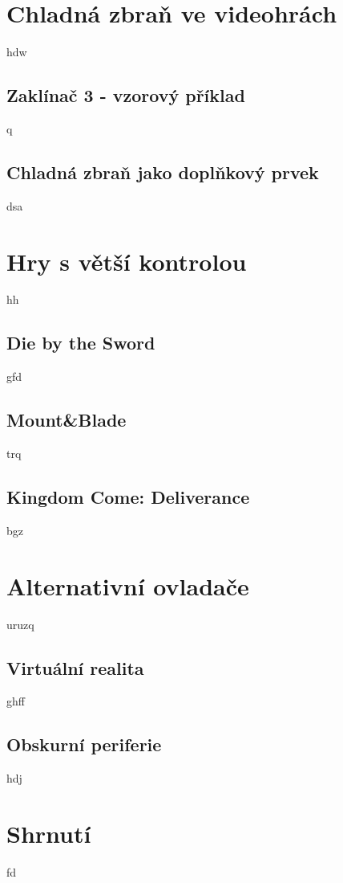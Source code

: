 \section{Chladná zbraň ve videohrách}
hdw

\subsection{Zaklínač 3 - vzorový příklad}
q

\subsection{Chladná zbraň jako doplňkový prvek}
dsa



\section{Hry s větší kontrolou}
hh

\subsection{Die by the Sword}
gfd

\subsection{Mount\&Blade}
trq

\subsection{Kingdom Come: Deliverance}
bgz


\section{Alternativní ovladače}
uruzq

\subsection{Virtuální realita}
ghff

\subsection{Obskurní periferie}
hdj


\section{Shrnutí}
fd
